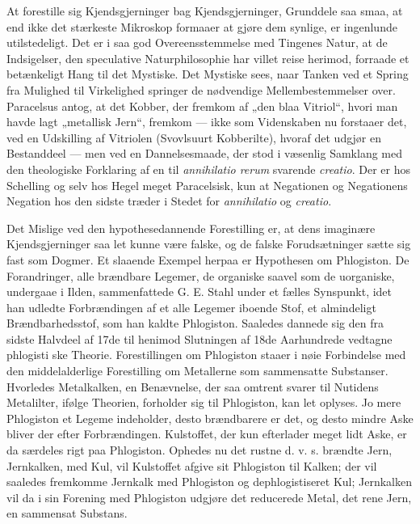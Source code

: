 \documentclass[12pt,a4paper]{book}
\begin{document}
At forestille sig Kjendsgjerninger bag Kjendsgjerninger, Grunddele saa
smaa, at end ikke det stærkeste Mikroskop formaaer at gjøre dem synlige,
er ingenlunde utilstedeligt. Det er i saa god Overeensstemmelse med
Tingenes Natur, at de Indsigelser, den speculative Naturphilosophie har
villet reise herimod, forraade et betænkeligt Hang til det Mystiske. Det
Mystiske sees, naar Tanken ved et Spring fra Mulighed til Virkelighed
springer de nødvendige Mellembestemmelser over. Paracelsus antog, at det
Kobber, der fremkom af „den blaa Vitriol“, hvori man havde lagt „metallisk
Jern“, fremkom --- ikke som Videnskaben nu forstaaer det, ved en
Udskilling af Vitriolen (Svovlsuurt Kobberilte), hvoraf det udgjør en
Bestanddeel --- men ved en Dannelsesmaade, der stod i væsenlig Samklang
med den theologiske Forklaring af en til \textit{annihilatio rerum}
svarende \textit{creatio}. Der er hos Schelling og selv hos Hegel meget
Paracelsisk, kun at Negationen og Negationens Negation hos den sidste
træder i Stedet for \textit{annihilatio} og \textit{creatio}.

Det Mislige ved den hypothesedannende Forestilling er, at dens imaginære
Kjendsgjerninger saa let kunne være falske, og de falske Forudsætninger
sætte sig fast som Dogmer. Et slaaende Exempel herpaa er Hypothesen om
Phlogiston. De Forandringer, alle brændbare Legemer, de organiske saavel
som de uorganiske, undergaae i Ilden, sammenfattede G. E. Stahl under et
fælles Synspunkt, idet han udledte Forbrændingen af et alle Legemer
iboende Stof, et almindeligt Brændbarhedsstof, som han kaldte Phlogiston.
Saaledes dannede sig den fra sidste Halvdeel af 17de til henimod
Slutningen af 18de Aarhundrede vedtagne phlogisti\-%
ske Theorie. Forestillingen om Phlogiston staaer i nøie Forbindelse med
den middelalderlige Forestilling om Metallerne som sammensatte Substanser.
Hvorledes Metalkalken, en Benævnelse, der saa omtrent svarer til Nutidens
Metalilter, ifølge Theorien, forholder sig til Phlogiston, kan let oplyses.
Jo mere Phlogiston et Legeme indeholder, desto brændbarere er det, og
desto mindre Aske bliver der efter Forbrændingen. Kulstoffet, der kun
efterlader meget lidt Aske, er da særdeles rigt paa Phlogiston. Ophedes nu
det rustne d. v. s. brændte Jern, Jernkalken, med Kul, vil Kulstoffet
afgive sit Phlogiston til Kalken; der vil saaledes fremkomme Jernkalk med
Phlogiston og dephlogistiseret Kul; Jernkalken vil da i sin Forening med
Phlogiston udgjøre det reducerede Metal, det rene Jern, en sammensat
Substans.
\end{document}

